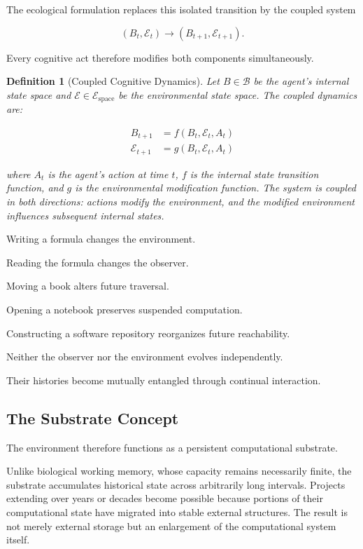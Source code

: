 \documentclass[12pt,oneside]{article}
\newtheorem{definition}{Definition}[section]
\theoremstyle{remark}
\begin{document}
The ecological formulation replaces this isolated transition by the coupled system

\[
(B_t, \mathcal{E}_t) \longrightarrow (B_{t+1}, \mathcal{E}_{t+1}).
\]

Every cognitive act therefore modifies both components simultaneously.

\begin{definition}[Coupled Cognitive Dynamics]
Let \(B \in \mathcal{B}\) be the agent's internal state space and \(\mathcal{E} \in \mathcal{E}_{\text{space}}\) be the environmental state space. The coupled dynamics are:

\[
\begin{aligned}
B_{t+1} &= f(B_t, \mathcal{E}_t, A_t) \\
\mathcal{E}_{t+1} &= g(B_t, \mathcal{E}_t, A_t)
\end{aligned}
\]

where \(A_t\) is the agent's action at time \(t\), \(f\) is the internal state transition function, and \(g\) is the environmental modification function. The system is coupled in both directions: actions modify the environment, and the modified environment influences subsequent internal states.
\end{definition}

Writing a formula changes the environment.

Reading the formula changes the observer.

Moving a book alters future traversal.

Opening a notebook preserves suspended computation.

Constructing a software repository reorganizes future reachability.

Neither the observer nor the environment evolves independently.

Their histories become mutually entangled through continual interaction.

\subsection{The Substrate Concept}

The environment therefore functions as a persistent computational substrate.

Unlike biological working memory, whose capacity remains necessarily finite, the substrate accumulates historical state across arbitrarily long intervals. Projects extending over years or decades become possible because portions of their computational state have migrated into stable external structures. The result is not merely external storage but an enlargement of the computational system itself.
\end{document}
